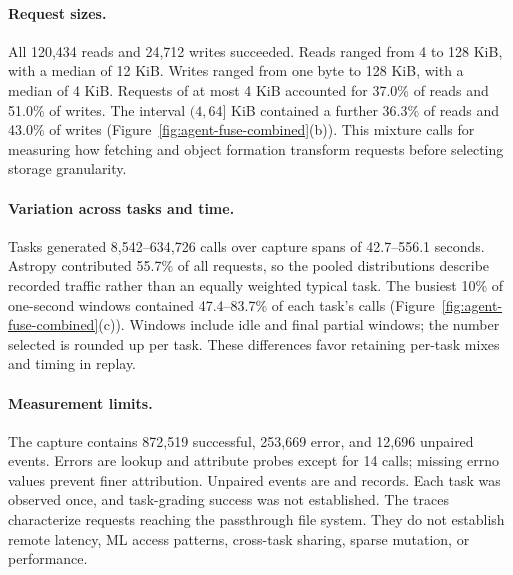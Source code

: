 \paragraph{Request sizes.}
All 120,434 reads and 24,712 writes succeeded.
Reads ranged from 4 to 128 KiB, with a median of 12 KiB.
Writes ranged from one byte to 128 KiB, with a median of 4 KiB.
Requests of at most 4 KiB accounted for 37.0\% of reads and
51.0\% of writes. The interval $(4,64]$ KiB contained a further
36.3\% of reads and 43.0\% of writes
(Figure~\ref{fig:agent-fuse-combined}(b)).
This mixture calls for measuring how fetching and object formation
transform requests before selecting storage granularity.

\paragraph{Variation across tasks and time.}
Tasks generated 8,542--634,726 calls over capture spans of
42.7--556.1 seconds. Astropy contributed 55.7\% of all requests,
so the pooled distributions describe recorded traffic rather than
an equally weighted typical task.
The busiest 10\% of one-second windows contained 47.4--83.7\% of each
task's calls (Figure~\ref{fig:agent-fuse-combined}(c)). Windows include idle
and final partial windows; the number selected is rounded up per task.
These differences favor retaining per-task mixes and timing in replay.

\paragraph{Measurement limits.}
The capture contains 872,519 successful, 253,669 error, and 12,696
unpaired events. Errors are lookup and attribute probes except for 14
 calls; missing errno values prevent finer attribution.
Unpaired events are  and  records. Each task
was observed once, and task-grading success was not established.
The traces characterize requests reaching the passthrough file system.
They do not establish remote latency, ML access patterns, cross-task
sharing, sparse mutation, or \sys performance.
